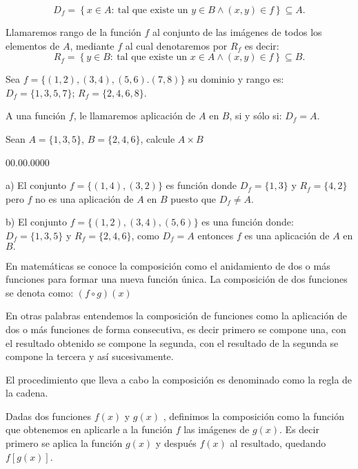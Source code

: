 \[
D_{f}=\left\{ x\in A:\:\mbox{tal que existe un }y\in B\wedge\left(x,y\right)\in f\right\} \subseteq A.
\]


Llamaremos rango de la función $f$ al conjunto de las imágenes de
todos los elementos de $A$, mediante $f$ al cual denotaremos por
$R_{f}$ es decir: 
\[
R_{f}=\left\{ y\in B:\:\mbox{tal que existe un }x\in A\wedge\left(x,y\right)\in f\right\} \subseteq B.
\]


\begin{ejem}{} Sea $f=\{(1,2),(3,4),(5,6).(7,8)\}$ su dominio y
rango es: $D_{f}=\{1,3,5,7\}$; $R_{f}=\{2,4,6,8\}.$\end{ejem} 

\nota A una función $f$, le llamaremos aplicación de $A$ en $B$,
si y sólo si: $D_{f}=A$. 

\begin{ejem}{} Sean $A=\{1,3,5\}$, $B=\{2,4,6\}$, calcule $A\times B$ 
\begin{lyxlist}{00.00.0000}
\item [{a)}] El conjunto $f=\{(1,4),(3,2)\}$ es función donde $D_{f}=\{1,3\}$
y $R_{f}=\{4,2\}$ pero $f$ no es una aplicación de $A$ en $B$
puesto que $D_{f}\neq A.$
\item [{b)}] El conjunto $f=\{(1,2),(3,4),(5,6)\}$ es una función donde:
$D_{f}=\{1,3,5\}$ y $R_{f}=\{2,4,6\}$, como $D_{f}=A$ entonces
$f$ es una aplicación de $A$ en $B.$
\end{lyxlist}
\end{ejem}

En matemáticas se conoce la composición como el anidamiento de dos
o más funciones para formar una nueva función única. La composición
de dos funciones se denota como: $\left(f\circ g\right)\left(x\right)$

En otras palabras entendemos la composición de funciones como la aplicación
de dos o más funciones de forma consecutiva, es decir primero se compone
una, con el resultado obtenido se compone la segunda, con el resultado
de la segunda se compone la tercera y así sucesivamente. 

El procedimiento que lleva a cabo la composición es denominado como
la regla de la cadena.

Dadas dos funciones $f(x)$ y $g(x)$ , definimos la composición como
la función que obtenemos en aplicarle a la función $f$ las imágenes
de $g(x)$. Es decir primero se aplica la función $g(x)$ y después
$f(x)$ al resultado, quedando $f\left[g\left(x\right)\right]$. 



